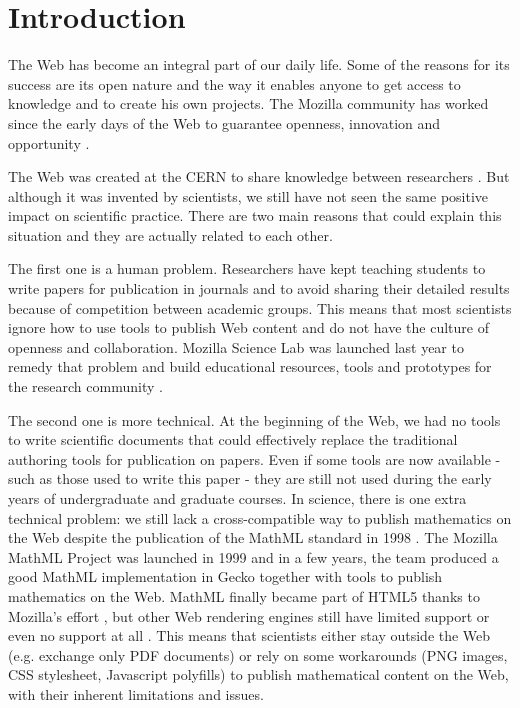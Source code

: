 \section*{Introduction}

The Web has become an integral part of our daily life. Some of the reasons for
its success are its open nature and the way it enables anyone to get access to
knowledge and to create his own projects. The Mozilla community has worked since
the early days of the Web to guarantee openness, innovation and opportunity
\cite{MozillaMission}.

The Web was created at the CERN to share knowledge between researchers
\cite{WebCreation}.
But although it was invented by scientists, we still have not seen
the same positive impact on scientific practice. There are two main reasons that
could explain this situation and they are actually related to each other.

The first one is a human problem. Researchers have kept teaching students
to write papers for publication in journals and to avoid sharing their detailed
results because of competition between academic groups. This means that most
scientists ignore
how to use tools to publish Web content and do not have the culture of openness
and collaboration. Mozilla Science Lab was launched last year to remedy that
problem and build educational resources, tools and prototypes for the research
community \cite{MozillaScienceLab}.

The second one is more technical. At the beginning of the Web, we had no tools
to write scientific documents that could effectively replace the traditional
authoring tools for publication on papers.
Even if some tools are now available - such as those used to write this paper -
they are still not used
during the early years of undergraduate and graduate courses.
In science, there is one extra technical problem:
we still lack a cross-compatible way to publish
mathematics on the Web despite the publication of the MathML standard in 1998
\cite{W3CMathHome}.
The Mozilla MathML Project \cite{MozillaMathML}
was launched in 1999 and in a few years, the team produced a good MathML
implementation in Gecko together with tools to publish mathematics on the Web.
MathML finally
became part of HTML5 thanks to Mozilla's effort \cite{MozillaMathMLHTML5},
but other Web rendering
engines still have limited support or even no support at all
\cite{MathMLForgesOn}. This means that
scientists either stay outside the Web (e.g. exchange only PDF documents) or
rely on some workarounds (PNG images, CSS stylesheet, Javascript polyfills)
to publish mathematical content on the Web, with their inherent limitations and
issues.

